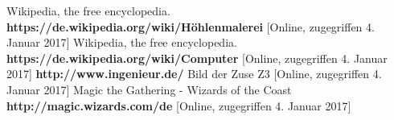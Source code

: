  Wikipedia, the free encyclopedia. \textbf{https://de.wikipedia.org/wiki/Höhlenmalerei} [Online, zugegriffen 4. Januar 2017]
 Wikipedia, the free encyclopedia. \textbf{https://de.wikipedia.org/wiki/Computer} [Online, zugegriffen 4. Januar 2017]
 \textbf{http://www.ingenieur.de/} Bild der Zuse Z3 [Online, zugegriffen 4. Januar 2017]
 Magic the Gathering - Wizards of the Coast \textbf{http://magic.wizards.com/de} [Online, zugegriffen 4. Januar 2017]